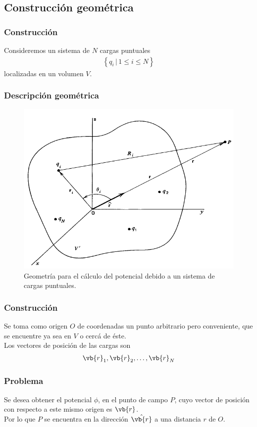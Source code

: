 \subsection{Construcción geométrica}
\begin{frame}
\frametitle{Construcción}
Consideremos un sistema de $N$ cargas puntuales
\begin{align*}
\left\{ q_{i} \, | \, 1 \leq i \leq N \right\}
\end{align*}
localizadas en un volumen $V$.
\end{frame}
\begin{frame}
\frametitle{Descripción geométrica}
\begin{figure}
    \centering
    \includegraphics[scale=0.3, keepaspectratio]{Imagenes/Desarrollo_multipolar.png}
    \caption{Geometría para el cálculo del potencial debido a un sistema de cargas puntuales.}
    \label{fig:figura_multipolar_01}
\end{figure}
\end{frame}
\begin{frame}
\frametitle{Construcción}
Se toma como origen $O$ de coordenadas un punto arbitrario pero conveniente, que se encuentre ya sea en $V$ o cercá de éste.
\\
\bigskip
\pause
Los vectores de posición de las cargas son
\begin{align*}
\vb{r}_{1}, \vb{r}_{2}, \ldots, \vb{r}_{N}  
\end{align*}
\end{frame}
\begin{frame}
\frametitle{Problema}
Se desea obtener el potencial $\phi$, en el punto de campo $P$, cuyo vector de posición con respecto a este mismo origen es $\vb{r}$.
\\
\bigskip
\pause
Por lo que $P$ se encuentra en la dirección $\hat{\vb{r}}$ a una distancia $r$ de $O$.
\end{frame}
